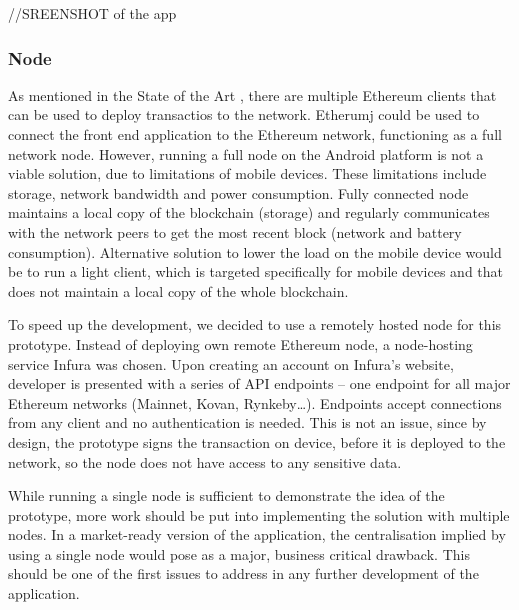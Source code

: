 //SREENSHOT of the app

\subsubsection{Node}
As mentioned in the State of the Art \pageref{sec:eth-clients}, there are multiple Ethereum clients that can be used to deploy transactios to the network. Etherumj could be used to connect the front end application to the Ethereum network, functioning as a full network node. However, running a full node on the Android platform is not a viable solution, due to limitations of mobile devices. These limitations include storage, network bandwidth and power consumption\footnotemark.%
% 
Fully connected node maintains a local copy of the blockchain (storage) and regularly communicates with the network peers to get the most recent block (network and battery consumption). Alternative solution to lower the load on the mobile device would be to run a light client\footnotemark, which is targeted specifically for mobile devices and that does not maintain a local copy of the whole blockchain.
% 

To speed up the development, we decided to use a remotely hosted node for this prototype. Instead of deploying own remote Ethereum node, a node-hosting service Infura was chosen. Upon creating an account on Infura’s website, developer is presented with a series of API endpoints – one endpoint for all major Ethereum networks (Mainnet, Kovan, Rynkeby…). Endpoints accept connections from any client and no authentication is needed. This is not an issue, since by design, the prototype signs the transaction on device, before it is deployed to the network, so the node does not have access to any sensitive data.

While running a single node is sufficient to demonstrate the idea of the prototype, more work should be put into implementing the solution with multiple nodes. In a market-ready version of the application, the centralisation implied by using a single node would pose as a major, business critical drawback. This should be one of the first issues to address in any further development of the application.
% 
